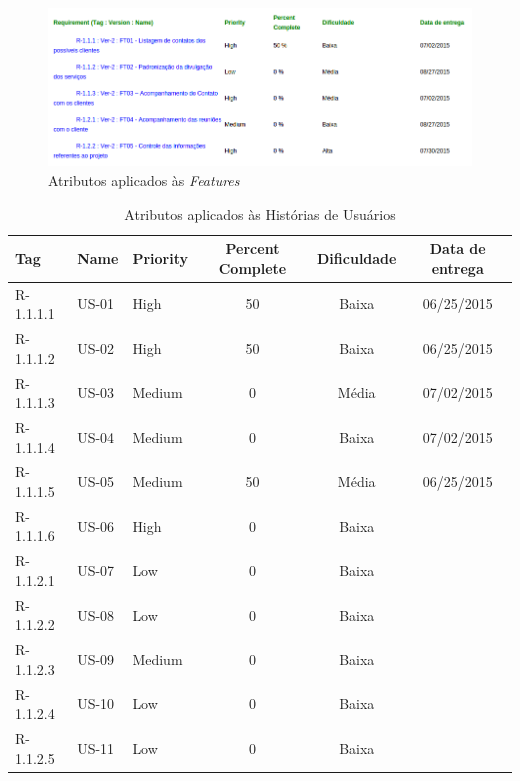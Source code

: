\begin{figure}[h]
 \centering
 \includegraphics[width=1\linewidth]{figuras/atributos_features.png}
 \caption{Atributos aplicados às \textit{Features}}
 \label{fig:atri_features}
\end{figure}

\begin{table}
\centering
\caption{Atributos aplicados às Histórias de Usuários}
\label{tab:atri_historias}
\begin{tabular}{ | l | l | l | c | c | c |}
\hline
Tag        & Name  & Priority & Percent Complete & Dificuldade & Data de entrega \\ \hline
R-1.1.1.1  & US-01 & High     & 50               & Baixa       & 06/25/2015      \\\hline
R-1.1.1.2  & US-02 & High     & 50               & Baixa       & 06/25/2015      \\\hline
R-1.1.1.3  & US-03 & Medium   & 0                & Média       & 07/02/2015      \\\hline
R-1.1.1.4  & US-04 & Medium   & 0                & Baixa       & 07/02/2015      \\\hline
R-1.1.1.5  & US-05 & Medium   & 50               & Média       & 06/25/2015      \\\hline
R-1.1.1.6  & US-06 & High     & 0                & Baixa       &                 \\\hline
R-1.1.2.1  & US-07 & Low      & 0                & Baixa       &                 \\\hline
R-1.1.2.2  & US-08 & Low      & 0                & Baixa       &                 \\\hline
R-1.1.2.3  & US-09 & Medium   & 0                & Baixa       &                 \\\hline
R-1.1.2.4  & US-10 & Low      & 0                & Baixa       &                 \\\hline
R-1.1.2.5  & US-11 & Low      & 0                & Baixa       &                 \\\hline

\end{tabular}
\end{table}
